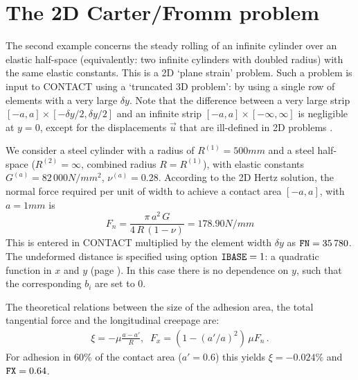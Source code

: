 \documentclass[12pt]{report}
\begin{document}
\section{The 2D Carter/Fromm problem}
\label{sec:ex_carter_fromm}

The second example concerns the steady rolling of an infinite cylinder over
an elastic half-space (equivalently: two infinite cylinders with doubled
radius) with the same elastic constants. This is a 2D `plane strain'
problem. Such a problem is input to CONTACT using a `truncated 3D
problem': by using a single row of elements with a very large $\delta y$.
Note that the difference between a very large strip $[-a,a]\times[-\delta
y/2,\delta y/2]$ and an infinite strip $[-a,a]\times[-\infty,\infty]$ is
negligible at $y=0$, except for the displacements $\vec{u}$ that are
ill-defined in 2D problems \cite{Johnson1985}.

We consider a steel cylinder with a radius of $R^{(1)}=500\unit{mm}$ and a
steel half-space ($R^{(2)}=\infty$, combined radius $R=R^{(1)}$), with
elastic constants $G^{(a)}=82\,000\unit{N/mm^2}$, $\nu^{(a)}=0.28$.
According to the 2D Hertz solution, the normal force required per unit of
width to achieve a contact area $[-a,a]$, with $a=1\unit{mm}$ is
\begin{equation}\label{eq:fn_2d_hertz}
        F_n = \frac{\pi \,a^2 \,G}{4 \,R \,(1-\nu)} = 178.90\unit{N/mm}
\end{equation}
This is entered in CONTACT multiplied by the element width $\delta y$ as
${\tt FN}=35\,780$. The undeformed distance is specified using option ${\tt
IBASE}=1$: a quadratic function in $x$ and $y$ (page \pageref{itm:ibase1}).
In this case there is no dependence on $y$, such that the corresponding
$b_i$ are set to 0.

The theoretical relations between the size of the adhesion area, the total
tangential force and the longitudinal creepage are:
\begin{eqnarray}
  \xi = -\mu \frac{a-a'}{R}, \;\;
   F_x = (1 - (a'/a)^2 ) \, \mu F_n \,.
\end{eqnarray}
For adhesion in 60\% of the contact area ($a'=0.6$) this yields
$\xi=-0.024\%$ and ${\tt FX}=0.64$.
\end{document}
